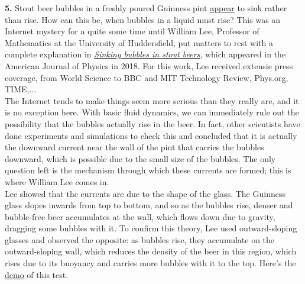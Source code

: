 \documentclass[11pt]{article}
\begin{document}
\noindent \textbf{5.} Stout beer bubbles in a freshly poured Guinness pint  \href{https://www.youtube.com/watch?v=dSAqCahJyPE\&ab_channel=i20d1}{{appear}} to sink rather than rise. How can this be, when bubbles in a liquid must rise? This was an Internet mystery for a quite some time until William Lee, Professor of Mathematics at the University of Huddersfield, put matters to rest with a complete explanation in  \href{https://aapt.scitation.org/doi/full/10.1119/1.5021361}{\textit{Sinking bubbles in stout beers}}, which appeared in the American Journal of Physics in 2018. For this work, Lee received extensie press coverage, from World Science to BBC and MIT Technology Review, Phys.org, TIME,...\\

\noindent The Internet tends to make things seem more serious than they really are, and it is no exception here. With basic fluid dynamics, we can immediately rule out the possibility that the bubbles actually rise in the beer. In fact, other scientists have done experiments and simulations to check this and concluded that it is actually the downward current near the wall of the pint that carries the bubbles downward, which is possible due to the small size of the bubbles. The only question left is the mechanism through which these currents are formed; this is where William Lee comes in.  \\

\noindent Lee showed that the currents are due to the shape of the glass. The Guinness glass slopes inwards from top to bottom, and so as the bubbles rise, denser and bubble-free beer accumulates at the wall, which flows down due to gravity, dragging some bubbles with it. To confirm this theory, Lee used outward-sloping glasses and observed the opposite: as bubbles rise, they accumulate on the outward-sloping wall, which reduces the density of the beer in this region, which rises due to its buoyancy and carries more bubbles with it to the top. Here's the \href{https://www.youtube.com/watch?v=2_V2MRNlZOs\&ab_channel=MathematicalModelling}{demo} of this test.
  
\end{document}
